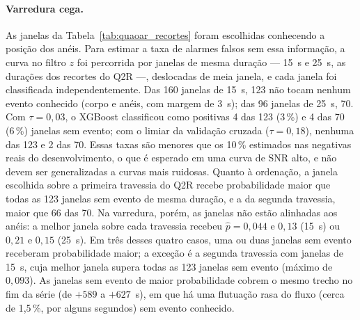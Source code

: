 \paragraph{Varredura cega.} As janelas da Tabela~\ref{tab:quaoar_recortes} foram escolhidas conhecendo a posição dos anéis. Para estimar a taxa de alarmes falsos sem essa informação, a curva no filtro $z$ foi percorrida por janelas de mesma duração --- 15~s e 25~s, as durações dos recortes do Q2R ---, deslocadas de meia janela, e cada janela foi classificada independentemente. Das 160 janelas de 15~s, 123 não tocam nenhum evento conhecido (corpo e anéis, com margem de 3~s); das 96 janelas de 25~s, 70. Com $\tau = 0{,}03$, o XGBoost classificou como positivas 4 das 123 (3\,\%) e 4 das 70 (6\,\%) janelas sem evento; com o limiar da validação cruzada ($\tau = 0{,}18$), nenhuma das 123 e 2 das 70. Essas taxas são menores que os 10\,\% estimados nas negativas reais do desenvolvimento, o que é esperado em uma curva de SNR alto, e não devem ser generalizadas a curvas mais ruidosas. Quanto à ordenação, a janela escolhida sobre a primeira travessia do Q2R recebe probabilidade maior que todas as 123 janelas sem evento de mesma duração, e a da segunda travessia, maior que 66 das 70. Na varredura, porém, as janelas não estão alinhadas aos anéis: a melhor janela sobre cada travessia recebeu $\hat{p} = 0{,}044$ e $0{,}13$ (15~s) ou $0{,}21$ e $0{,}15$ (25~s). Em três desses quatro casos, uma ou duas janelas sem evento receberam probabilidade maior; a exceção é a segunda travessia com janelas de 15~s, cuja melhor janela supera todas as 123 janelas sem evento (máximo de $0{,}093$). As janelas sem evento de maior probabilidade cobrem o mesmo trecho no fim da série (de $+589$ a $+627$~s), em que há uma flutuação rasa do fluxo (cerca de 1,5\,\%, por alguns segundos) sem evento conhecido.

